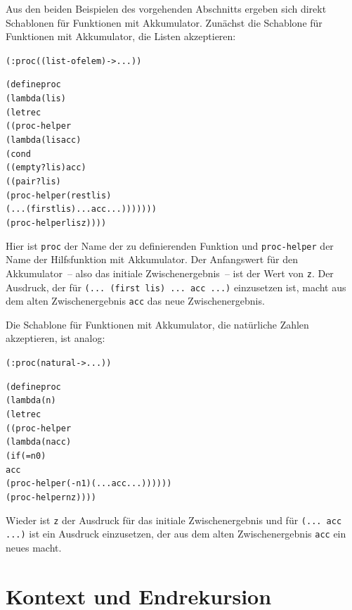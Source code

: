 Aus den beiden Beispielen des vorgehenden Abschnitts ergeben sich
direkt Schablonen für Funktionen mit Akkumulator.  Zunächst die
Schablone für Funktionen mit Akkumulator, die Listen akzeptieren:
%
\begin{alltt}
(: proc ((list-of elem) -> ...))

(define proc
  (lambda (lis)
    (letrec
       ((proc-helper
         (lambda (lis acc)
            (cond
              ((empty? lis) acc)
              ((pair? lis)
                 (proc-helper (rest lis)
                    (... (first lis) ... acc ...)))))))
    (proc-helper lis z))))
\end{alltt}
%
Hier ist \texttt{proc} der Name der zu definierenden Funktion
und \texttt{proc-helper} der Name der Hilfsfunktion mit
Akkumulator.  Der Anfangswert für den Akkumulator~-- also das initiale
Zwischenergebnis~-- ist der Wert von \texttt{z}.  Der
Ausdruck, der für \texttt{(... (first lis) ... acc ...)} einzusetzen
ist, macht aus dem alten Zwischenergebnis \texttt{acc} das neue
Zwischenergebnis.

Die Schablone für Funktionen mit Akkumulator, die natürliche Zahlen
akzeptieren, ist analog:
%
\begin{alltt}
(: proc (natural -> ...))

(define proc
  (lambda (n)
    (letrec
      ((proc-helper
        (lambda (n acc)
          (if (= n 0)
              acc
              (proc-helper (- n 1) (... acc ...))))))
    (proc-helper n z))))
\end{alltt}
%
Wieder ist \texttt{z} der Ausdruck für das initiale Zwischenergebnis
und für \texttt{(... acc ...)} ist ein Ausdruck einzusetzen, der aus
dem alten Zwischenergebnis \texttt{acc} ein neues macht.

\section{Kontext und Endrekursion}
\label{sec:iteration}

